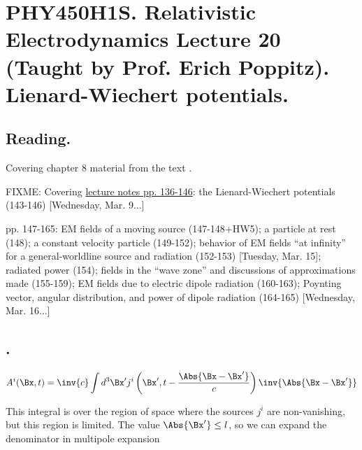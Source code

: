 
%

\chapter{PHY450H1S.  Relativistic Electrodynamics Lecture 20 (Taught by Prof. Erich Poppitz).  Lienard-Wiechert potentials.}
\label{chap:relativisticElectrodynamicsL20}
{}
\date{Mar 15, 2011}

\beginArtNoToc

\section{Reading.}

Covering chapter 8 material from the text \cite{landau1980classical}.

FIXME:
Covering \href{http://www.physics.utoronto.ca/~poppitz/epoppitz/PHY450_files/RelEMpp136-146.pdf}{lecture notes pp. 136-146}: the Lienard-Wiechert potentials (143-146) [Wednesday, Mar. 9...]

pp. 147-165: EM fields of a moving source (147-148+HW5); a particle at rest (148); a constant velocity particle (149-152); behavior of EM fields ``at infinity'' for a general-worldline source and radiation (152-153) [Tuesday, Mar. 15]; radiated power (154); fields in the ``wave zone'' and discussions of approximations made (155-159); EM fields due to electric dipole radiation (160-163); Poynting vector, angular distribution, and power of dipole radiation (164-165) [Wednesday, Mar. 16...]

\section{.}

\begin{equation}\label{eqn:relativisticElectrodynamicsL20:10}
A^i(\Bx, t) = \inv{c} \int d^3 \Bx' j^i\left(\Bx', t - \frac{\Abs{\Bx - \Bx'}}{c}\right) \inv{\Abs{\Bx - \Bx'}}
\end{equation}

This integral is over the region of space where the sources $j^i$ are non-vanishing, but this region is limited.  The value $\Abs{\Bx'} \le l$, so we can expand the denominator in multipole expansion

